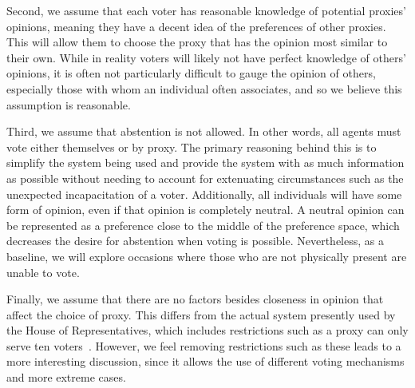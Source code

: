 Second, we assume that each voter has reasonable knowledge of potential proxies'
opinions, meaning they have a decent idea of the preferences of other proxies.
This will allow them to choose the proxy that has the opinion most similar to their own.
While in reality voters will likely not have perfect knowledge of others' opinions,
it is often not particularly difficult to gauge the opinion of others, especially
those with whom an individual often associates, and so we believe this assumption is
reasonable.

Third, we assume that abstention is not allowed.
In other words, all agents must vote either themselves or by proxy.
The primary reasoning behind this is to simplify the system being used and provide
the system with as much information as possible without needing to account for
extenuating circumstances such as the unexpected incapacitation of a voter.
Additionally, all individuals will have some form of opinion, even if that opinion is
completely neutral.
A neutral opinion can be represented as a preference close to the middle of the
preference space, which decreases the desire for abstention when voting is possible.
Nevertheless, as a baseline, we will explore occasions where those who are not
physically present are unable to vote.

Finally, we assume that there are no factors besides closeness in opinion that affect
the choice of proxy.
This differs from the actual system presently used by the House of Representatives,
which includes restrictions such as a proxy can only serve ten voters~\cite{CERP2020}.
However, we feel removing restrictions such as these leads to a more interesting
discussion, since it allows the use of different voting mechanisms and more extreme
cases.


